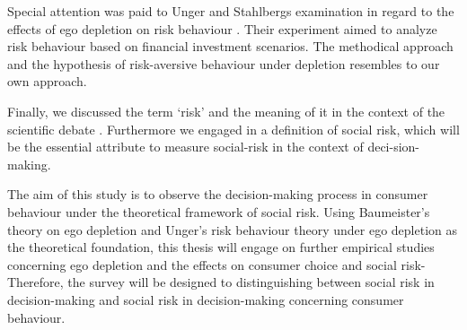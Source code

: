Special attention was paid to Unger and Stahlbergs examination in regard to the effects of ego depletion on risk behaviour \citep{unger2011ego}. Their experiment aimed to analyze risk behaviour based on financial investment scenarios. The methodical approach and the hypothesis of risk-aversive behaviour under depletion resembles to our own approach.\par
Finally, we discussed the term ‘risk’ and the meaning of it in the context of the scientific debate \citep{ross1975perceived,dowling1994model}. Furthermore we engaged in a definition of social risk, which will be the essential attribute to measure social-risk in the context of deci-sion-making.\par
The aim of this study is to observe the decision-making process in consumer behaviour under the theoretical framework of social risk. Using Baumeister’s  theory on ego depletion and Unger’s risk behaviour theory under ego depletion as the theoretical foundation, this thesis will engage on further empirical studies concerning ego depletion and the effects on consumer choice and social risk-
Therefore, the survey will be designed to distinguishing between social risk in decision-making and social risk in decision-making concerning consumer behaviour.

